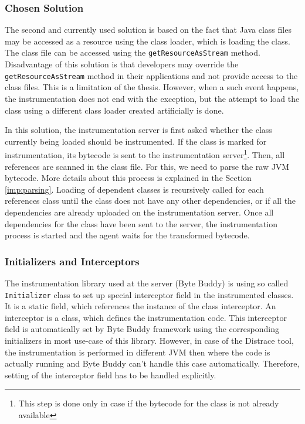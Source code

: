 \subsubsection{Chosen Solution}
The second and currently used solution is based on the fact that Java class files may be accessed as a resource using the class loader, which is loading the class. The class file can be accessed using the \texttt{getResourceAsStream} method. Disadvantage of this solution is that developers may override the \texttt{getResourceAsStream} method in their applications and not provide access to the class files. This is a limitation of the thesis. However, when a such event happens, the instrumentation does not end with the exception, but the attempt to load the class using a different class loader created artificially is done. 

In this solution, the instrumentation server is first asked whether the class currently being loaded should be instrumented. If the class is marked for instrumentation, its bytecode is sent to the instrumentation server\footnote{This step is done only in case if the bytecode for the class is not already available}. Then, all references are scanned in the class file. For this, we need to parse the raw JVM bytecode. More details about this process is explained in the Section \ref{imp:parsing}. Loading of dependent classes is recursively called for each references class until the class does not have any other dependencies, or if all the dependencies are already uploaded on the instrumentation server. Once all dependencies for the class have been sent to the server, the instrumentation process is started and the agent waits for the transformed bytecode. 

\subsubsection{Initializers and Interceptors}
The instrumentation library used at the server (Byte Buddy) is using so called \texttt{Initializer} class to set up special interceptor field in the instrumented classes. It is a static field, which references the instance of the class interceptor. An interceptor is a class, which defines the instrumentation code. This interceptor field is automatically set by Byte Buddy framework using the corresponding initializers in most use-case of this library. However, in case of the Distrace tool, the instrumentation is performed in different JVM then where the code is actually running and Byte Buddy can't handle this case automatically. Therefore, setting of the interceptor field has to be handled explicitly.

